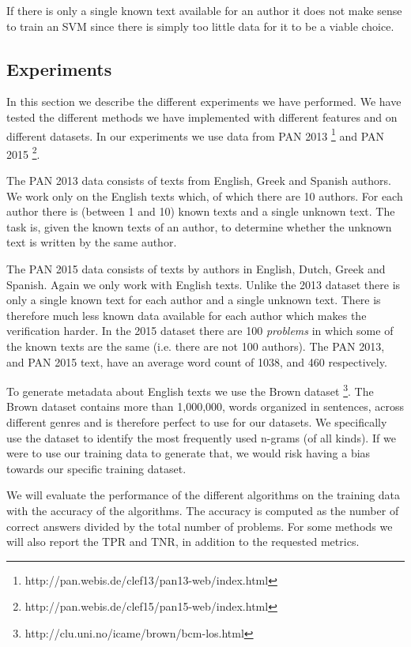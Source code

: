 If there is only a single known text available for an author it does not make
sense to train an \gls{SVM} since there is simply too little data for it
to be a viable choice.

\subsection{Experiments} \label{subsec:method:experiments}
In this section we describe the different experiments we have performed.
We have tested the different methods we have implemented with different
features and on different datasets. In our experiments we use data from PAN
2013 \footnote{http://pan.webis.de/clef13/pan13-web/index.html} and PAN 2015
\footnote{http://pan.webis.de/clef15/pan15-web/index.html}.

The PAN 2013 data consists of texts from English, Greek and Spanish authors. We
work only on the English texts which, of which there are 10 authors. For each
author there is (between 1 and 10) known texts and a single unknown text. The
task is, given the known texts of an author, to determine whether the unknown
text is written by the same author.

The PAN 2015 data consists of texts by authors in English, Dutch, Greek and
Spanish. Again we only work with English texts. Unlike the 2013 dataset there
is only a single known text for each author and a single unknown text. There
is therefore much less known data available for each author which makes the
verification harder. In the 2015 dataset there are 100 \textit{problems} in
which some of the known texts are the same (i.e. there are not 100 authors).
The PAN 2013, and PAN 2015 text, have an average word count of 1038, and 460
respectively.

To generate metadata about English texts we use the Brown dataset
\footnote{http://clu.uni.no/icame/brown/bcm-los.html}. The Brown dataset
contains more than 1,000,000, words organized in sentences, across different
genres and is therefore perfect to use for our datasets. We specifically use the
dataset to identify the most frequently used n-grams (of all kinds). If we were
to use our training data to generate that, we would risk having a bias towards
our specific training dataset.

We will evaluate the performance of the different algorithms on the training
data with the accuracy of the algorithms. The accuracy is computed as the number
of correct answers divided by the total number of problems. For some methods
we will also report the \gls{TPR} and \gls{TNR}, in addition to the requested
metrics.

